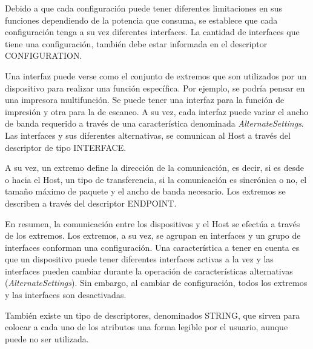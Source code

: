 Debido a que cada configuración puede tener diferentes limitaciones en sus funciones dependiendo de la potencia que consuma, se establece que cada configuración tenga a su vez diferentes interfaces. La cantidad de interfaces que tiene una configuración, también debe estar informada en el descriptor CONFIGURATION.%

Una interfaz puede verse como el conjunto de extremos que son utilizados por un dispositivo para realizar una función específica. Por ejemplo, se podría pensar en una impresora multifunción. Se puede tener una interfaz para la función de impresión y otra para la de escaneo. A su vez, cada interfaz puede variar el ancho de banda requerido a través de una característica denominada \textit{AlternateSettings}. Las interfaces y sus diferentes alternativas, se comunican al Host a través del descriptor de tipo INTERFACE.%

A su vez, un extremo define la dirección de la comunicación, es decir, si es desde o hacia el Host, un tipo de transferencia, si la comunicación es sincrónica o no, el tamaño máximo de paquete y el ancho de banda necesario. Los extremos se describen a través del descriptor ENDPOINT.%

En resumen, la comunicación entre los dispositivos y el Host se efectúa a través de los extremos. Los extremos, a su vez, se agrupan en interfaces y un grupo de interfaces conforman una configuración. Una característica a tener en cuenta es que un dispositivo puede tener diferentes interfaces activas a la vez y las interfaces pueden cambiar durante la operación de características alternativas (\textit{AlternateSettings}). Sin embargo, al cambiar de configuración, todos los extremos y las interfaces son desactivadas.%

También existe un tipo de descriptores, denominados STRING, que sirven para colocar a cada uno de los atributos una forma legible por el usuario, aunque puede no ser utilizada. 

